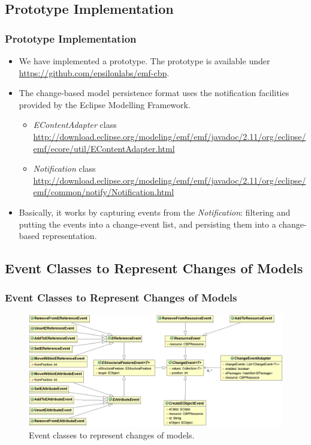 \documentclass{beamer}
\begin{document}
\begin{frame}
\section{Prototype Implementation}
\frametitle{Prototype Implementation}
\begin{itemize}
\item We have implemented a prototype. The prototype is available under \url{https://github.com/epsilonlabs/emf-cbp}.
\item The change-based model persistence format uses the notification facilities provided by the Eclipse Modelling Framework. 
\begin{itemize}
\item \emph{EContentAdapter} class  {\tiny \url{http://download.eclipse.org/modeling/emf/emf/javadoc/2.11/org/eclipse/emf/ecore/util/EContentAdapter.html}} 
\item \emph{Notification} class {\tiny\url{http://download.eclipse.org/modeling/emf/emf/javadoc/2.11/org/eclipse/emf/common/notify/Notification.html}}
\end{itemize}
\item Basically, it works by capturing events from the \emph{Notification}: filtering and putting the events into a change-event list, and persisting them into a change-based representation.
\end{itemize}
\end{frame}

\begin{frame}
\section{Event Classes to Represent Changes of Models}
\frametitle{Event Classes to Represent Changes of Models}
\begin{figure}[htbh]
\centering
\includegraphics[width=\linewidth]{events}
\caption{Event classes to represent changes of models.}
\label{fig:events}
\end{figure}
\end{frame}
\end{document}
